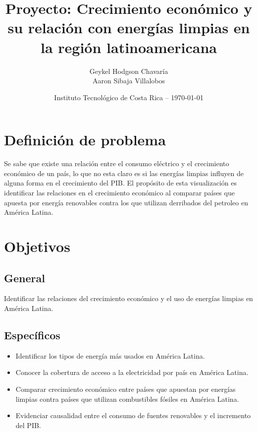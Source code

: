 \documentclass{article}
\title{Proyecto: Crecimiento económico y su relación con energías limpias en la región latinoamericana
} %
\author{Geykel Hodgson Chavaría\\ 
Aaron Sibaja Villalobos  
} %
\date{Instituto  Tecnológico de Costa Rica -- \today} %
\begin{document}
\renewcommand{\listtablename}{Índice de tablas}
\renewcommand{\tablename}{Tabla} 

\maketitle %


\section{Definición de problema}
Se sabe que existe una relación entre el consumo eléctrico y el crecimiento económico de un país, lo que no esta claro es si las energías limpias influyen de alguna forma en el crecimiento del PIB. El propósito de esta visualización es identificar las relaciones en el crecimiento económico al comparar países que apuesta por energía renovables contra los que utilizan derribados del petroleo en América Latina.

\section{Objetivos}
\subsection{General}
Identificar las relaciones del crecimiento económico y el uso de energías limpias en América Latina.
\subsection{Específicos }
\begin{itemize}
    \item Identificar los tipos de energía más usados en América Latina.
    \item Conocer la cobertura de acceso a la electricidad por país en América Latina.
    \item Comparar crecimiento económico entre países que apuestan por energías limpias contra países que utilizan combustibles fósiles en América Latina.
    \item Evidenciar causalidad entre el consumo de fuentes renovables y el incremento del PIB.
\end{itemize}
\end{document}
